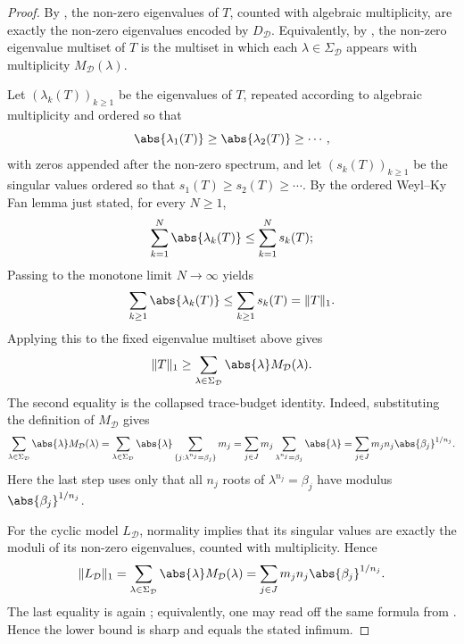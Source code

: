 \begin{proof}
  By , the non-zero eigenvalues of
  \(T\), counted with algebraic multiplicity, are exactly the non-zero
  eigenvalues encoded by \(D_{\mathcal D}\). Equivalently, by
  , the non-zero eigenvalue
  multiset of \(T\) is the multiset in which each
  \(\lambda\in\Sigma_{\mathcal D}\) appears with multiplicity
  \(M_{\mathcal D}(\lambda)\).

  Let \((\lambda_k(T))_{k\ge1}\) be the eigenvalues of \(T\), repeated
  according to algebraic multiplicity and ordered so that
  \[
    \abs{\lambda_1(T)}\ge \abs{\lambda_2(T)}\ge \cdots,
  \]
  with zeros appended after the non-zero spectrum, and let
  \((s_k(T))_{k\ge1}\) be the singular values ordered so that
  \(s_1(T)\ge s_2(T)\ge \cdots\). By the ordered Weyl--Ky Fan lemma just
  stated, for every \(N\ge1\),
  \[
    \sum_{k=1}^N \abs{\lambda_k(T)}
    \le \sum_{k=1}^N s_k(T);
  \]
  Passing to the monotone limit \(N\to\infty\) yields
  \[
    \sum_{k\ge1}\abs{\lambda_k(T)}
    \le \sum_{k\ge1}s_k(T)
    =\|T\|_1.
  \]
  Applying this to the fixed eigenvalue multiset above gives
  \[
    \|T\|_1
    \ge \sum_{\lambda\in\Sigma_{\mathcal D}}
      \abs{\lambda}M_{\mathcal D}(\lambda).
  \]
  The second equality is the collapsed trace-budget identity.  Indeed,
  substituting the definition of \(M_{\mathcal D}\) gives
  \[
    \sum_{\lambda\in\Sigma_{\mathcal D}}
      \abs{\lambda}M_{\mathcal D}(\lambda)
    =
    \sum_{\lambda\in\Sigma_{\mathcal D}}
      \abs{\lambda}
      \sum_{\{j:\lambda^{n_j}=\beta_j\}}m_j
    =
    \sum_{j\in J}m_j
      \sum_{\lambda^{n_j}=\beta_j}\abs{\lambda}
    =
    \sum_{j\in J}m_jn_j\abs{\beta_j}^{1/n_j}.
  \]
  Here the last step uses only that all \(n_j\) roots of
  \(\lambda^{n_j}=\beta_j\) have modulus \(\abs{\beta_j}^{1/n_j}\).

  For the cyclic model \(L_{\mathcal D}\), normality implies that its
  singular values are exactly the moduli of its non-zero eigenvalues,
  counted with multiplicity. Hence
  \[
    \|L_{\mathcal D}\|_1
    =\sum_{\lambda\in\Sigma_{\mathcal D}}
      \abs{\lambda}M_{\mathcal D}(\lambda)
    =\sum_{j\in J}m_j n_j\abs{\beta_j}^{1/n_j}.
  \]
  The last equality is again
  ; equivalently, one may
  read off the same formula from
  .
  Hence the lower bound is sharp and equals the stated infimum.


\end{proof}
